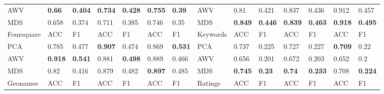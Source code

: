 {\begin{landscape}
\begin{table}[]
\begin{tabular}{llllllllllllll}
AWV        & \textbf{0.66}  & \textbf{0.404} & \textbf{0.734} & \textbf{0.428} & \textbf{0.755} & \textbf{0.39}  & AWV                             & 0.81                            & 0.421                           & 0.837                           & 0.436                           & 0.912                           & 0.457                           \\
MDS        & 0.658                           & 0.374                           & 0.711                           & 0.385                           & 0.746                           & 0.35                            & MDS                             & \textbf{0.849} & \textbf{0.446} & \textbf{0.839} & \textbf{0.463} & \textbf{0.918} & \textbf{0.495} \\
Foursquare & ACC                             & F1                              & ACC                             & F1                              & ACC                             & F1                              & Keywords                        & ACC                             & F1                              & ACC                             & F1                              & ACC                             & F1                              \\
PCA        & 0.785                           & 0.477                           & \textbf{0.907} & 0.474                           & 0.869                           & \textbf{0.531} & PCA                             & 0.737                           & 0.225                           & 0.727                           & 0.227                           & \textbf{0.709} & 0.22                            \\
AWV        & \textbf{0.918} & \textbf{0.541} & 0.881                           & \textbf{0.498} & 0.889                           & 0.466                           & AWV                             & 0.656                           & 0.201                           & 0.672                           & 0.203                           & 0.652                           & 0.2                             \\
MDS        & 0.82                            & 0.416                           & 0.879                           & 0.482                           & \textbf{0.897} & 0.485                           & MDS                             & \textbf{0.745} & \textbf{0.23}  & \textbf{0.74}  & \textbf{0.233} & 0.708                           & \textbf{0.224} \\
Geonames   & ACC                             & F1                              & ACC                             & F1                              & ACC                             & F1                              & Ratings                         & ACC                             & F1                              & ACC                             & F1                              & ACC                             & F1                              \\

\end{tabular}
\end{table}
\end{landscape}}
